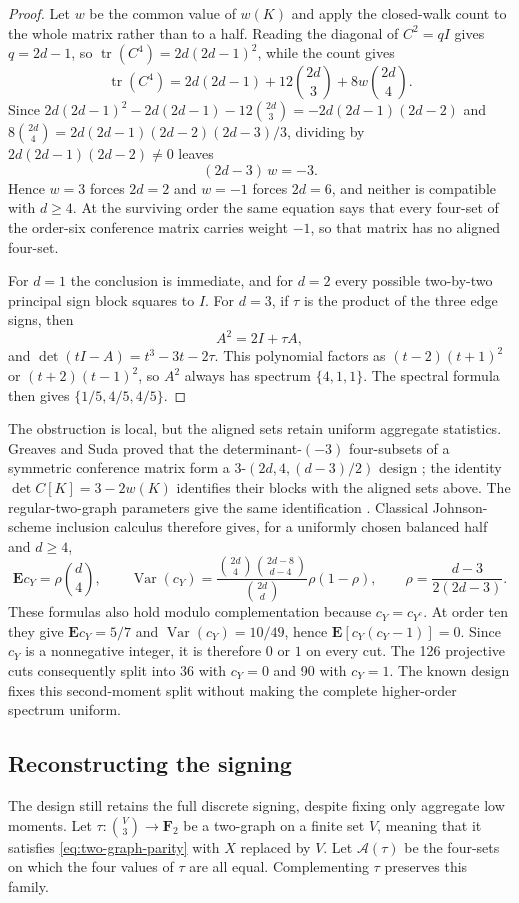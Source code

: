 \begin{proof}
Let \(w\) be the common value of \(w(K)\) and apply the closed-walk count to
the whole matrix rather than to a half.  Reading the diagonal of \(C^2=qI\)
gives \(q=2d-1\), so \(\operatorname{tr}(C^4)=2d(2d-1)^2\), while the count
gives
\[
 \operatorname{tr}(C^4)=2d(2d-1)+12\binom{2d}3+8w\binom{2d}4 .
\]
Since \(2d(2d-1)^2-2d(2d-1)-12\binom{2d}3=-2d(2d-1)(2d-2)\) and
\(8\binom{2d}4=2d(2d-1)(2d-2)(2d-3)/3\), dividing by
\(2d(2d-1)(2d-2)\neq0\) leaves
\[
 (2d-3)\,w=-3 .
\]
Hence \(w=3\) forces \(2d=2\) and \(w=-1\) forces \(2d=6\), and neither is
compatible with \(d\geq4\).  At the surviving order the same equation says
that every four-set of the order-six conference matrix carries weight \(-1\),
so that matrix has no aligned four-set.

For \(d=1\) the conclusion is immediate, and for \(d=2\) every possible
two-by-two principal sign block squares to \(I\).  For \(d=3\), if \(\tau\)
is the product of the three edge signs, then
\[
 A^2=2I+\tau A,
\]
and \(\det(tI-A)=t^3-3t-2\tau\).  This polynomial factors as
\((t-2)(t+1)^2\) or \((t+2)(t-1)^2\), so \(A^2\) always has spectrum
\(\{4,1,1\}\).  The spectral formula then gives
\(\{1/5,4/5,4/5\}\).
\end{proof}

The obstruction is local, but the aligned sets retain uniform aggregate
statistics.  Greaves and Suda proved that the determinant-\((-3)\)
four-subsets of a symmetric conference matrix form a
\(3\)-\((2d,4,(d-3)/2)\) design \cite[Example~2.3]{GreavesSuda}; the identity
\(\det C[K]=3-2w(K)\) identifies their blocks with the aligned sets above.
The regular-two-graph parameters give the same identification
\cite[Section~2.2 and Proposition~4.1]{GillespieTwoGraph}.  Classical
Johnson-scheme inclusion calculus \cite[Section~8]{IntersectionMatrices}
therefore gives, for a uniformly chosen balanced half and \(d\geq4\),
\[
 \mathbf E c_Y=\rho\binom d4,\qquad
 \operatorname{Var}(c_Y)=
 \frac{\binom{2d}{4}\binom{2d-8}{d-4}}{\binom{2d}{d}}
 \rho(1-\rho),
 \qquad \rho=\frac{d-3}{2(2d-3)}.
\]
These formulas also hold modulo complementation because \(c_Y=c_{Y^c}\).
At order ten they give \(\mathbf E c_Y=5/7\) and
\(\operatorname{Var}(c_Y)=10/49\), hence
\(\mathbf E[c_Y(c_Y-1)]=0\).  Since \(c_Y\) is a nonnegative integer, it is
therefore \(0\) or \(1\) on every cut.  The 126 projective cuts consequently split
into 36 with \(c_Y=0\) and 90 with \(c_Y=1\).  The known design fixes this
second-moment split without making the complete higher-order spectrum uniform.

\subsection{Reconstructing the signing}
\label{sec:reconstruct-signing}
The design still retains the full discrete signing, despite fixing only
aggregate low moments.  Let
\(\tau:\binom V3\to\mathbf F_2\) be a two-graph on a finite set \(V\), meaning
that it satisfies \eqref{eq:two-graph-parity} with \(X\) replaced by \(V\).
Let \(\mathcal A(\tau)\) be the four-sets on which the four values of
\(\tau\) are all equal.  Complementing \(\tau\) preserves this family.

